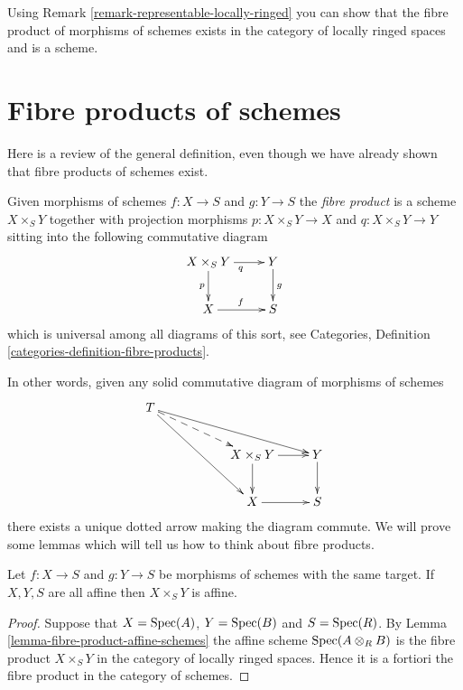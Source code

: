 \begin{remark}
\label{remark-fibre-product-schemes-locally-ringed}
Using Remark \ref{remark-representable-locally-ringed}
you can show that the fibre product of morphisms of schemes
exists in the category of locally ringed spaces and is a
scheme.
\end{remark}




\section{Fibre products of schemes}
\label{section-fibre-products}

\noindent
Here is a review of the general definition, even though
we have already shown that fibre products of schemes exist.

\begin{definition}
\label{definition-fibre-product}
\begin{reference}
\cite[Chapter II, \S 1, no. 33, Propositions 6 and 7,
pp. 225--226, and no. 34, Corollary to Proposition 8, p. 227]{FAC}
\end{reference}
Given morphisms of schemes $f : X \to S$ and $g : Y \to S$
the {\it fibre product} is a scheme $X \times_S Y$ together
with projection morphisms $p : X \times_S Y \to X$
and $q : X \times_S Y \to Y$ sitting into the following
commutative diagram
$$
\xymatrix{
X \times_S Y \ar[r]_q \ar[d]_p & Y \ar[d]^g \\
X \ar[r]^f & S
}
$$
which is universal among all diagrams of this sort,
see Categories, Definition \ref{categories-definition-fibre-products}.
\end{definition}

\noindent
In other words, given any solid commutative diagram of
morphisms of schemes
$$
\xymatrix{
T \ar[rrrd] \ar@{-->}[rrd] \ar[rrdd]
&
&
\\
&
&
X \times_S Y \ar[d] \ar[r]
&
Y \ar[d]
\\
&
&
X \ar[r]
&
S
}
$$
there exists a unique dotted arrow making the diagram commute.
We will prove some lemmas which will tell us how to think about
fibre products.

\begin{lemma}
\label{lemma-fibre-product-affines}
Let $f : X \to S$ and $g : Y \to S$ be morphisms of schemes
with the same target. If $X, Y, S$ are all affine then
$X \times_S Y$ is affine.
\end{lemma}

\begin{proof}
Suppose that $X = \mathop{\mathrm{Spec}}(A)$, $Y = \mathop{\mathrm{Spec}}(B)$
and $S = \mathop{\mathrm{Spec}}(R)$. By Lemma \ref{lemma-fibre-product-affine-schemes}
the affine scheme $\mathop{\mathrm{Spec}}(A \otimes_R B)$
is the fibre product $X \times_S Y$ in the category
of locally ringed spaces. Hence it is a fortiori the
fibre product in the category of schemes.
\end{proof}

